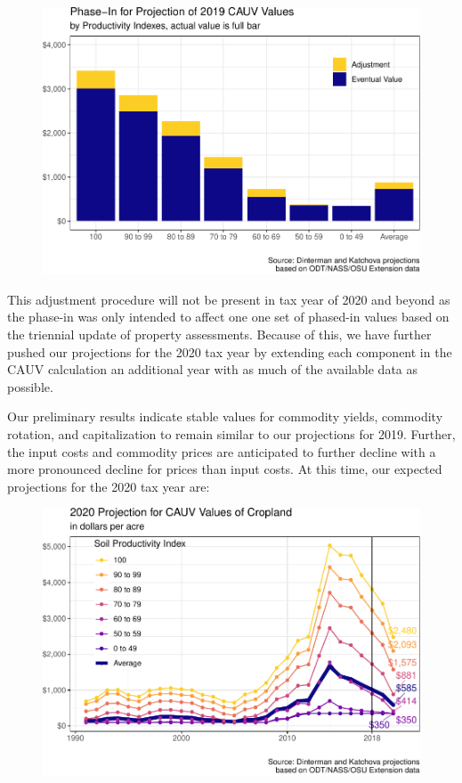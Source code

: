 \documentclass[]{article}
\begin{document}
\begin{figure}[H]
\includegraphics[width=1\linewidth]{4-projections-2019-2020_files/figure-latex/exp-2019-1} \caption{\label{fig:exp-2019}}\label{fig:exp-2019}
\end{figure}

This adjustment procedure will not be present in tax year of 2020 and
beyond as the phase-in was only intended to affect one one set of
phased-in values based on the triennial update of property assessments.
Because of this, we have further pushed our projections for the 2020 tax
year by extending each component in the CAUV calculation an additional
year with as much of the available data as possible.

Our preliminary results indicate stable values for commodity yields,
commodity rotation, and capitalization to remain similar to our
projections for 2019. Further, the input costs and commodity prices are
anticipated to further decline with a more pronounced decline for prices
than input costs. At this time, our expected projections for the 2020
tax year are:

\begin{figure}[H]
\includegraphics[width=1\linewidth]{4-projections-2019-2020_files/figure-latex/exp-trend-2020-1} \caption{\label{fig:exp-trend-2020}}\label{fig:exp-trend-2020}
\end{figure}
\end{document}
